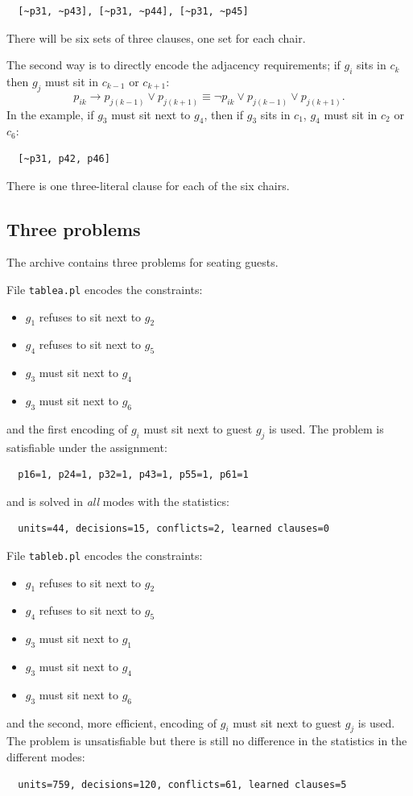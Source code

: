 \documentclass[11pt]{report}
\newcommand*{\p}[1]{\textup{\texttt{#1}}}
\newcommand*{\ngg}{\mathop{\neg}}
\begin{document}
\begin{verbatim}
  [~p31, ~p43], [~p31, ~p44], [~p31, ~p45] 
\end{verbatim}
There will be six sets of three clauses, one set for each chair.

The second way is to directly encode the adjacency requirements; if
$g_i$ sits in $c_{k}$ then $g_j$ must sit in $c_{k-1}$ or $c_{k+1}$:
\begin{displaymath}
p_{ik} \rightarrow p_{j(k-1)} \vee p_{j(k+1)} \equiv
\ngg p_{ik} \vee p_{j(k-1)} \vee p_{j(k+1)}.
\end{displaymath}
In the example, if $g_3$ must sit next to $g_4$, then if $g_3$ sits in
$c_1$, $g_4$ must sit in $c_2$ or $c_6$:
\begin{verbatim}
  [~p31, p42, p46]
\end{verbatim}
There is one three-literal clause for each of the six chairs.


\subsection{Three problems}

The archive contains three problems for seating guests.

File \p{tablea.pl} encodes the constraints:
\begin{itemize}
\item $g_1$ refuses to sit next to $g_2$
\item $g_4$ refuses to sit next to $g_5$
\item $g_3$ must  sit next to $g_4$ 
\item $g_3$ must  sit next to $g_6$ 
\end{itemize}
and the first encoding of $g_i$ must sit next to guest $g_j$ is used.
The problem is satisfiable under the assignment:
\begin{verbatim}
  p16=1, p24=1, p32=1, p43=1, p55=1, p61=1
\end{verbatim}
and is solved in \emph{all} modes with the statistics:
\begin{verbatim}
  units=44, decisions=15, conflicts=2, learned clauses=0
\end{verbatim}

File \p{tableb.pl} encodes the constraints:
\begin{itemize}
\item $g_1$ refuses to sit next to $g_2$
\item $g_4$ refuses to sit next to $g_5$
\item $g_3$ must  sit next to $g_1$
\item $g_3$ must  sit next to $g_4$ 
\item $g_3$ must  sit next to $g_6$ 
\end{itemize}
and the second, more efficient, encoding of $g_i$ must sit next to guest
$g_j$ is used. The problem is unsatisfiable but there is still no
difference in the statistics in the different modes:
\begin{verbatim}
  units=759, decisions=120, conflicts=61, learned clauses=5
\end{verbatim}
\end{document}
